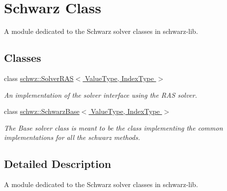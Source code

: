 \hypertarget{group__schwarz__class}{}\section{Schwarz Class}
\label{group__schwarz__class}


A module dedicated to the Schwarz solver classes in schwarz-\/lib.  


\subsection*{Classes}
\begin{DoxyCompactItemize}
\item 
class \hyperlink{classschwz_1_1SolverRAS}{schwz\+::\+Solver\+R\+A\+S$<$ Value\+Type, Index\+Type $>$}
\begin{DoxyCompactList}\small\item\em An implementation of the solver interface using the R\+AS solver. \end{DoxyCompactList}\item 
class \hyperlink{classschwz_1_1SchwarzBase}{schwz\+::\+Schwarz\+Base$<$ Value\+Type, Index\+Type $>$}
\begin{DoxyCompactList}\small\item\em The Base solver class is meant to be the class implementing the common implementations for all the schwarz methods. \end{DoxyCompactList}\end{DoxyCompactItemize}


\subsection{Detailed Description}
A module dedicated to the Schwarz solver classes in schwarz-\/lib. 

